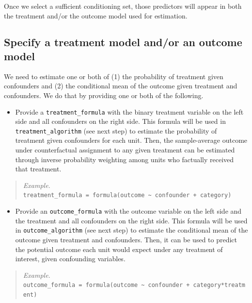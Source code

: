 \documentclass[
]{article}
\providecommand{\tightlist}{%
  \setlength{\itemsep}{0pt}\setlength{\parskip}{0pt}}
\begin{document}
Once we select a sufficient conditioning set, those predictors will appear in both the treatment and/or the outcome model used for estimation.

\subsection{Specify a treatment model and/or an outcome model}\label{specify-a-treatment-model-andor-an-outcome-model}

We need to estimate one or both of (1) the probability of treatment given confounders and (2) the conditional mean of the outcome given treatment and confounders. We do that by providing one or both of the following.

\begin{itemize}
\tightlist
\item
  Provide a \texttt{treatment\_formula} with the binary treatment variable on the left side and all confounders on the right side. This formula will be used in \texttt{treatment\_algorithm} (see next step) to estimate the probability of treatment given confounders for each unit. Then, the sample-average outcome under counterfactual assignment to any given treatment can be estimated through inverse probability weighting among units who factually received that treatment.
\end{itemize}

\begin{quote}
\emph{Example.}\\
\texttt{treatment\_formula\ =\ formula(outcome\ \textasciitilde{}\ confounder\ +\ category)}
\end{quote}

\begin{itemize}
\tightlist
\item
  Provide an \texttt{outcome\_formula} with the outcome variable on the left side and the treatment and all confounders on the right side. This formula will be used in \texttt{outcome\_algorithm} (see next step) to estimate the conditional mean of the outcome given treatment and confounders. Then, it can be used to predict the potential outcome each unit would expect under any treatment of interest, given confounding variables.
\end{itemize}

\begin{quote}
\emph{Example.}\\
\texttt{outcome\_formula\ =\ formula(outcome\ \textasciitilde{}\ confounder\ +\ category*treatment)}
\end{quote}
\end{document}
